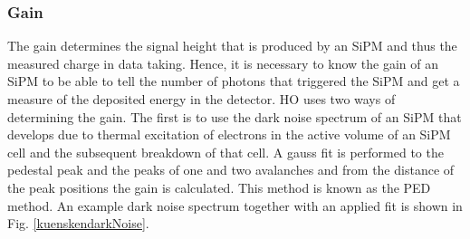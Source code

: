 \subsubsection{Gain}
The gain determines the signal height that is produced by an SiPM and thus the measured charge in data taking. Hence, it is necessary to know the gain of an SiPM to be able to tell the number of photons that triggered the SiPM and get a measure of the deposited energy in the detector. HO uses two ways of determining the gain.
The first is to use the dark noise spectrum of an SiPM that develops due to thermal excitation of electrons in the active volume of an SiPM cell and the subsequent breakdown of that cell. A gauss fit is performed to the pedestal peak and the peaks of one and two avalanches and from the distance of the peak positions the gain is calculated. This method is known as the PED method. An example dark noise spectrum together with an applied fit is shown in Fig. \ref{kuenskendarkNoise}.

